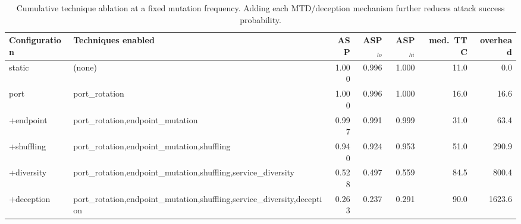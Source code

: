 \begin{table}[t]
\centering
\caption{Cumulative technique ablation at a fixed mutation frequency. Adding each MTD/deception mechanism further reduces attack success probability.}
\label{tab:ablation}
\begin{tabular}{llrrrrr}
\toprule
Configuration & Techniques enabled & ASP & ASP$_{lo}$ & ASP$_{hi}$ & med.\ TTC & overhead \\
\midrule
static & (none) & 1.000 & 0.996 & 1.000 & 11.0 & 0.0 \\
port & port\_rotation & 1.000 & 0.996 & 1.000 & 16.0 & 16.6 \\
+endpoint & port\_rotation,endpoint\_mutation & 0.997 & 0.991 & 0.999 & 31.0 & 63.4 \\
+shuffling & port\_rotation,endpoint\_mutation,shuffling & 0.940 & 0.924 & 0.953 & 51.0 & 290.9 \\
+diversity & port\_rotation,endpoint\_mutation,shuffling,service\_diversity & 0.528 & 0.497 & 0.559 & 84.5 & 800.4 \\
+deception & port\_rotation,endpoint\_mutation,shuffling,service\_diversity,deception & 0.263 & 0.237 & 0.291 & 90.0 & 1623.6 \\
\bottomrule
\end{tabular}
\end{table}
